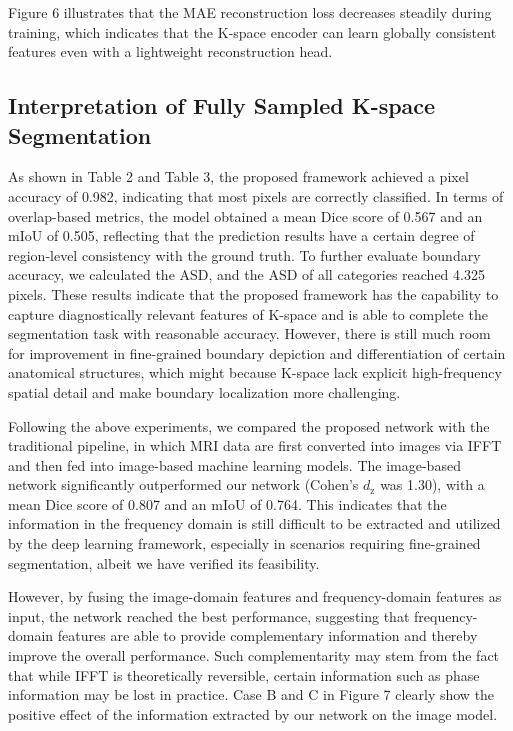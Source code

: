 \documentclass[12pt,a4paper]{article}
\begin{document}
Figure 6 illustrates that the MAE reconstruction loss decreases steadily during training, which indicates that the K-space encoder can learn globally consistent features even with a lightweight reconstruction head.


\vspace{-1em}
\subsection{Interpretation of Fully Sampled K-space Segmentation}
\vspace{-0.5em}
As shown in Table 2 and Table 3, the proposed framework achieved a pixel accuracy of 0.982, indicating that most pixels are correctly classified. In terms of overlap-based metrics, the model obtained a mean Dice score of 0.567 and an mIoU of 0.505, reflecting that the prediction results have a certain degree of region-level consistency with the ground truth. To further evaluate boundary accuracy, we calculated the ASD, and the ASD of all categories reached 4.325 pixels. These results indicate that the proposed framework has the capability to capture diagnostically relevant features of K-space and is able to complete the segmentation task with reasonable accuracy. However, there is still much room for improvement in fine-grained boundary depiction and differentiation of certain anatomical structures, which might because K-space lack explicit high-frequency spatial detail and make boundary localization more challenging.

Following the above experiments, we compared the proposed network with the traditional pipeline, in which MRI data are first converted into images via IFFT and then fed into image-based machine learning models. The image-based network significantly outperformed our network (Cohen's $d_{\mathrm{z}}$ was 1.30), with a mean Dice score of 0.807 and an mIoU of 0.764. This indicates that the information in the frequency domain is still difficult to be extracted and utilized by the deep learning framework, especially in scenarios requiring fine-grained segmentation, albeit we have verified its feasibility. 

However, by fusing the image-domain features and frequency-domain features as input, the network reached the best performance, suggesting that frequency-domain features are able to provide complementary information and thereby improve the overall performance. Such complementarity may stem from the fact that while IFFT is theoretically reversible, certain information such as phase information may be lost in practice. Case B and C in Figure 7 clearly show the positive effect of the information extracted by our network on the image model.
\end{document}
